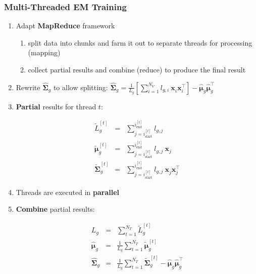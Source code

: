\documentclass[usenames,dvipsnames]{beamer}
\def\Vec#1{{\boldsymbol{#1}}}
\def\Mat#1{{\boldsymbol{#1}}}
\begin{document}
%
%
%

\begin{frame}
\frametitle{Multi-Threaded EM Training}

\begin{enumerate}[{~~$\boldsymbol{\bullet}$}]

\item Adapt {\bf MapReduce} framework

\begin{enumerate}[{$\boldsymbol{\rightarrow}$}]
\renewcommand{\itemsep}{1ex}
\item split data into chunks and farm it out to separate threads for processing (mapping)
\item collect partial results and combine (reduce) to produce the final result
\end{enumerate}
\vspace{1ex}

\item
Rewrite $\widehat{\Mat{\Sigma}}_g$ to allow splitting:
{$\widehat{\Mat{\Sigma}}_g = \frac{1}{L_g} \left[ \sum\nolimits_{i=1}^{N_V} l_{g,i} ~ \Vec{x}_i^{~} \Vec{x}_i^\top  \right] - \widehat{\Vec{\mu}}_g^{~} \widehat{\Vec{\mu}}_g^\top$}
\vspace{1ex}

\item {\bf Partial} results for thread $t$:
%
\vspace{-2ex}
\begin{footnotesize}%
\begin{eqnarray*}
  \widetilde{L}_g^{[t]}            & = & \sum\nolimits_{j = i^{[t]}_{\textrm{start}}}^{i^{[t]}_{\textrm{end}}} l_{g,j}                             \\
  \widetilde{\Vec{\mu}}_g^{[t]}    & = & \sum\nolimits_{j = i^{[t]}_{\textrm{start}}}^{i^{[t]}_{\textrm{end}}} l_{g,j} ~ \Vec{x}_j                 \\
  \widetilde{\Mat{\Sigma}}_g^{[t]} & = & \sum\nolimits_{j = i^{[t]}_{\textrm{start}}}^{i^{[t]}_{\textrm{end}}} l_{g,j} ~ \Vec{x}_j^{~} \Vec{x}_j^\top
\end{eqnarray*}%
\end{footnotesize}
\vspace{-1ex}

\item Threads are executed in {\bf parallel}

\item {\bf Combine} partial results:
%
\begin{footnotesize}%
\vspace{-2ex}
\begin{eqnarray*}
  L_g                      & = & \sum\nolimits_{t=1}^{N_T} \widetilde{L}_g^{[t]} \\
  \widehat{\Vec{\mu}}_g    & = & \frac{1}{L_g} \sum\nolimits_{t=1}^{N_T} \widetilde{\Vec{\mu}}_g^{[t]} \\
  \widehat{\Mat{\Sigma}}_g & = & \frac{1}{L_g} \sum\nolimits_{t=1}^{N_T} \widetilde{\Mat{\Sigma}}_g^{[t]} - \widehat{\Vec{\mu}}_g^{~} \widehat{\Vec{\mu}}_g^\top
\end{eqnarray*}%
\end{footnotesize}




\end{enumerate}
\end{frame}
\end{document}
